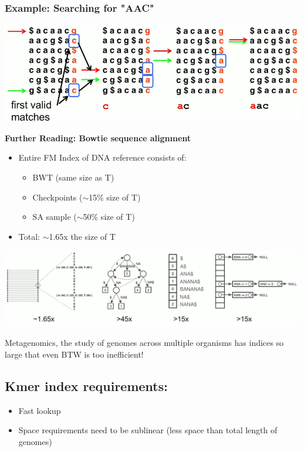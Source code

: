 \documentclass[10pt]{article}
\begin{document}
\subsubsection*{Example: Searching for "AAC"}
\begin{center}
    \includegraphics*[width=\textwidth]{W2_1.png}
\end{center}
\textbf{Further Reading: Bowtie sequence alignment}
\begin{itemize}
    \item Entire FM Index of DNA reference consists of:
    \begin{itemize}
        \item BWT (same size as T)
        \item Checkpoints ($\sim$15\% size of T)
        \item SA sample ($\sim$50\% size of T)
    \end{itemize}
    \item Total: $\sim$1.65x the size of T
\end{itemize}
\begin{center}
    \includegraphics*[width=\textwidth]{W2_2.png}
\end{center}
Metagenomics, the study of genomes across multiple organisms has indices so large that even BTW is too inefficient!
\subsection*{Kmer index requirements:}
\begin{itemize}
    \item Fast lookup
    \item Space requirements need to be sublinear (less space than total length of genomes)
\end{itemize}
\end{document}
